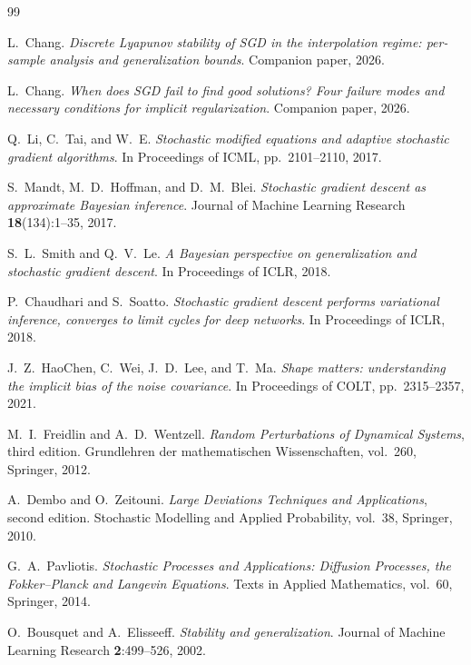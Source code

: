 \documentclass[11pt,a4paper]{article}
\theoremstyle{definition}
\theoremstyle{remark}
\begin{document}
\begin{thebibliography}{99}

L.~Chang.
\emph{Discrete Lyapunov stability of SGD in the interpolation regime:
   per-sample analysis and generalization bounds}.
Companion paper, 2026.

L.~Chang.
\emph{When does SGD fail to find good solutions?  Four failure modes and
   necessary conditions for implicit regularization}.
Companion paper, 2026.

Q.~Li, C.~Tai, and W.~E.
\emph{Stochastic modified equations and adaptive stochastic gradient
   algorithms}.
In Proceedings of ICML, pp.\ 2101--2110, 2017.

S.~Mandt, M.~D.~Hoffman, and D.~M.~Blei.
\emph{Stochastic gradient descent as approximate Bayesian inference}.
Journal of Machine Learning Research \textbf{18}(134):1--35, 2017.

S.~L.~Smith and Q.~V.~Le.
\emph{A Bayesian perspective on generalization and stochastic gradient
   descent}.
In Proceedings of ICLR, 2018.

P.~Chaudhari and S.~Soatto.
\emph{Stochastic gradient descent performs variational inference,
   converges to limit cycles for deep networks}.
In Proceedings of ICLR, 2018.

J.~Z.~HaoChen, C.~Wei, J.~D.~Lee, and T.~Ma.
\emph{Shape matters: understanding the implicit bias of the noise
   covariance}.
In Proceedings of COLT, pp.\ 2315--2357, 2021.

M.~I.~Freidlin and A.~D.~Wentzell.
\emph{Random Perturbations of Dynamical Systems}, third edition.
Grundlehren der mathematischen Wissenschaften, vol.\ 260,
Springer, 2012.

A.~Dembo and O.~Zeitouni.
\emph{Large Deviations Techniques and Applications}, second edition.
Stochastic Modelling and Applied Probability, vol.\ 38, Springer, 2010.

G.~A.~Pavliotis.
\emph{Stochastic Processes and Applications: Diffusion Processes, the
   Fokker--Planck and Langevin Equations}.
Texts in Applied Mathematics, vol.\ 60, Springer, 2014.

O.~Bousquet and A.~Elisseeff.
\emph{Stability and generalization}.
Journal of Machine Learning Research \textbf{2}:499--526, 2002.


\end{thebibliography}
\end{document}
